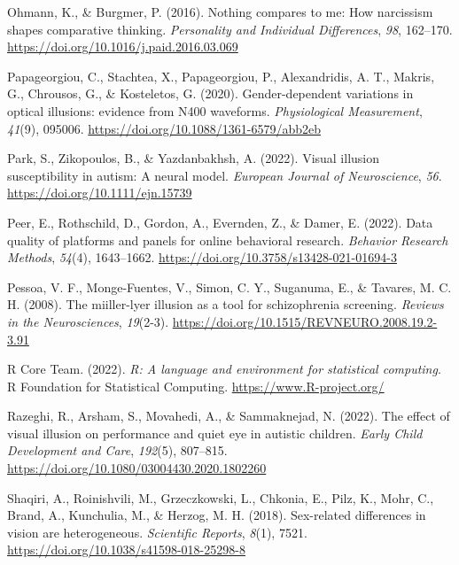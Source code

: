\documentclass[
  man,floatsintext]{apa6}
\newlength{\cslhangindent}
\newlength{\cslentryspacingunit} %
\newenvironment{CSLReferences}[2] %
 {%
  \setlength{\parindent}{0pt}
  \ifodd #1
  \let\oldpar\par
  \def\par{\hangindent=\cslhangindent\oldpar}
  \fi
  \setlength{\parskip}{#2\cslentryspacingunit}
 }%
 {}
\begin{document}
\begin{CSLReferences}{1}{0}
\leavevmode{}%
Ohmann, K., \& Burgmer, P. (2016). Nothing compares to me: How narcissism shapes comparative thinking. \emph{Personality and Individual Differences}, \emph{98}, 162--170. \url{https://doi.org/10.1016/j.paid.2016.03.069}

\leavevmode{}%
Papageorgiou, C., Stachtea, X., Papageorgiou, P., Alexandridis, A. T., Makris, G., Chrousos, G., \& Kosteletos, G. (2020). Gender-dependent variations in optical illusions: evidence from N400 waveforms. \emph{Physiological Measurement}, \emph{41}(9), 095006. \url{https://doi.org/10.1088/1361-6579/abb2eb}

\leavevmode{}%
Park, S., Zikopoulos, B., \& Yazdanbakhsh, A. (2022). Visual illusion susceptibility in autism: A neural model. \emph{European Journal of Neuroscience}, \emph{56}. \url{https://doi.org/10.1111/ejn.15739}

\leavevmode{}%
Peer, E., Rothschild, D., Gordon, A., Evernden, Z., \& Damer, E. (2022). Data quality of platforms and panels for online behavioral research. \emph{Behavior Research Methods}, \emph{54}(4), 1643--1662. \url{https://doi.org/10.3758/s13428-021-01694-3}

\leavevmode{}%
Pessoa, V. F., Monge-Fuentes, V., Simon, C. Y., Suganuma, E., \& Tavares, M. C. H. (2008). The miiller-lyer illusion as a tool for schizophrenia screening. \emph{Reviews in the Neurosciences}, \emph{19}(2-3). \url{https://doi.org/10.1515/REVNEURO.2008.19.2-3.91}

\leavevmode{}%
R Core Team. (2022). \emph{R: A language and environment for statistical computing}. R Foundation for Statistical Computing. \url{https://www.R-project.org/}

\leavevmode{}%
Razeghi, R., Arsham, S., Movahedi, A., \& Sammaknejad, N. (2022). The effect of visual illusion on performance and quiet eye in autistic children. \emph{Early Child Development and Care}, \emph{192}(5), 807--815. \url{https://doi.org/10.1080/03004430.2020.1802260}

\leavevmode{}%
Shaqiri, A., Roinishvili, M., Grzeczkowski, L., Chkonia, E., Pilz, K., Mohr, C., Brand, A., Kunchulia, M., \& Herzog, M. H. (2018). Sex-related differences in vision are heterogeneous. \emph{Scientific Reports}, \emph{8}(1), 7521. \url{https://doi.org/10.1038/s41598-018-25298-8}


\end{CSLReferences}
\end{document}

